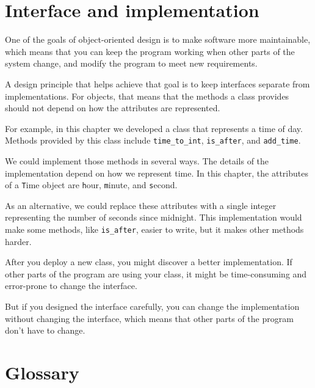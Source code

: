 \documentclass[
DIV=11,
fontsize=13,
twoside,
headinclude=false,
titlepage=firstiscover,
abstract=true,
headsepline=true,
footsepline=true,
chapterprefix=true, %
headings=big,
bibliography=totoc,%
captions=tableheading
]{scrbook}
\theoremstyle{definition}
\begin{document}
\section{Interface and implementation}

One of the goals of object-oriented design is to make software more
maintainable, which means that you can keep the program working when
other parts of the system change, and modify the program to meet new
requirements.

A design principle that helps achieve that goal is to keep
interfaces separate from implementations.  For objects, that means
that the methods a class provides should not depend on how the
attributes are represented.

For example, in this chapter we developed a class that represents
a time of day.  Methods provided by this class include
\verb"time_to_int", \verb"is_after", and \verb"add_time".

We could implement those methods in several ways.  The details of the
implementation depend on how we represent time.  In this chapter, the
attributes of a {\texttt Time} object are {\texttt hour}, {\texttt minute}, and
{\texttt second}.

As an alternative, we could replace these attributes with
a single integer representing the number of seconds
since midnight.  This implementation would make some methods,
like \verb"is_after", easier to write, but it makes other methods
harder.

After you deploy a new class, you might discover a better
implementation.  If other parts of the program are using your
class, it might be time-consuming and error-prone to change the
interface.  

But if you designed the interface carefully, you can
change the implementation without changing the interface, which
means that other parts of the program don't have to change.


\section{Glossary}
\end{document}
